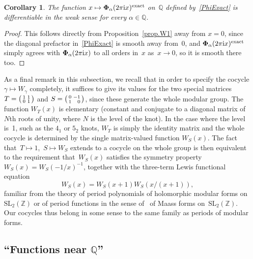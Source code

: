 \documentclass[pdftex]{sigma}
\numberwithin{equation}{section}
\newtheorem{Corollary}[Theorem]{Corollary}
\def\SL{\mathrm{SL}}
\def\a{\alpha}
\def\Z{\mathbb Z}
\def\Q{\mathbb Q}
\def\a{\alpha}
\def\sma#1#2#3#4{\bigl(\smallmatrix#1&#2\\#3&#4\endsmallmatrix\bigr)} %
\def\g{\gamma}
\def\bPhi{\mathbf\Phi}
\def\EXACT{^{\text{\rm exact}}}
\begin{document}
\begin{Corollary}
\label{PhiExactSmooth}
The function $x\mapsto\bPhi_\a(2\pi {\rm i}x)\EXACT$ on~$\Q$ defined by~\eqref{PhiExact}
is differentiable in the weak sense for every $\a\in\Q$.
\end{Corollary}

\begin{proof}
This follows directly from Proposition~\ref{prop.W1} away from $x=0$, since the
diagonal pre\-factor in~\eqref{PhiExact} is smooth away from~0, and
$\bPhi_\a(2\pi {\rm i}x)\EXACT$ simply agrees with $\bPhi_\a(2\pi {\rm i}x)$ to all orders in~$x$
as~$x\to0$, so it is smooth there too.
\end{proof}

As a final remark in this subsection, we recall that in order to specify
the cocycle $\g\mapsto W_\g$ completely, it suffices to give its values for
the two special matrices~$T=\sma1101$ and $S=\sma0{-1}1{\hphantom{-}0}$, since these generate the
whole modular group. The function $W_T(x)$ is elementary (constant and conjugate
to a diagonal matrix of $N$th roots of unity, where $N$ is the level of the knot).
In the case where the level is~1, such as the $4_1$ or $5_2$ knots, $W_T$ is
simply the identity matrix and the whole cocycle is determined by the single
matrix-valued function $W_S(x)$. The fact that~$T\mapsto1$,~$S\mapsto W_S$ extends to
a cocycle on the whole group is then equivalent to the requirement that~$W_S(x)$
satisfies the symmetry property $W_S(x) = W_S(-1/x)^{-1}$,
together with the three-term Lewis functional equation
\[%
W_S(x) = W_S(x+1) W_S(x/(x+1)) ,
\]
familiar from the theory of period polynomials of holomorphic modular forms on
$\SL_2(\Z)$ or of period functions in the sense of~\cite{Lewis-Zagier} of Maass forms
on~$\SL_2(\Z)$. Our cocycles thus belong in some sense to the same family as periods
of modular forms.

\subsection[``Functions near Q'']{``Functions near $\boldsymbol{\Q}$''}\label{sec.nearQ}
\end{document}
